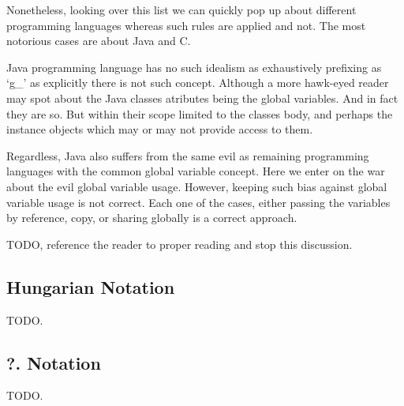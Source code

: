 \begin{englishtext}
    Nonetheless, looking over this list we can quickly pop up about different
    programming languages whereas such rules are applied and not. The most
    notorious cases are about Java and C.

    Java programming language has no such idealism as exhaustively prefixing as
    `g_' as explicitly there is not such concept. Although a more hawk-eyed
    reader may spot about the Java classes atributes being the global variables.
    And in fact they are so. But within their scope limited to the classes body,
    and perhaps the instance objects which may or may not provide access to
    them.

    Regardless, Java also suffers from the same evil as remaining programming
    languages with the common global variable concept. Here we enter on the
    war about the evil global variable usage. However, keeping such bias against
    global variable usage is not correct. Each one of the cases, either passing
    the variables by reference, copy, or sharing globally is a correct approach.

    TODO, reference the reader to proper reading and stop this discussion.


    \subsection{Hungarian Notation}

    TODO.


    \subsection{?. Notation}

    TODO.


\end{englishtext}


\lang{}{}


